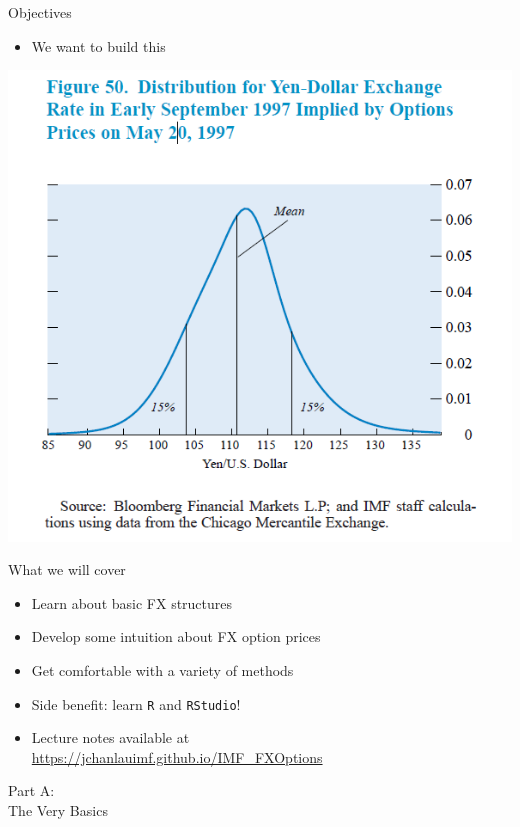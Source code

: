 \begin{frame}{Objectives}

\begin{itemize}
\tightlist
\item
  We want to build this
\end{itemize}

\begin{center}\includegraphics[width=0.6\linewidth]{images/figJPYRND} \end{center}

\end{frame}

\begin{frame}[fragile]{What we will cover}

\begin{itemize}
\tightlist
\item
  Learn about basic FX structures
\item
  Develop some intuition about FX option prices
\item
  Get comfortable with a variety of methods
\item
  Side benefit: learn \texttt{R} and \texttt{RStudio}!
\item
  Lecture notes available at\\
  \color{red} \url{https://jchanlauimf.github.io/IMF_FXOptions}
\end{itemize}

\end{frame}

\begin{frame}{}

\color{blue} \LARGE{Part A:}\\
\LARGE{The Very Basics}

\end{frame}

